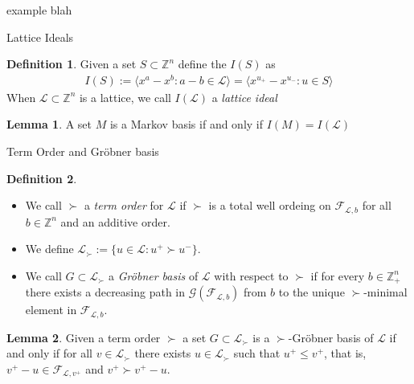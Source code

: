 \documentclass[9pt]{beamer}
\newcommand\set[1]{\{#1\}}
\newcommand\Z{\mathbb{Z}}
\theoremstyle{definition}
\newtheorem{lem}{Lemma}
\newtheorem{defn}{Definition}
\begin{document}
\begin{frame}[fragile]{example}
  blah
\end{frame}


\begin{frame}[fragile]{Lattice Ideals}
  \begin{defn}
    Given a set $S \subset \Z^n$ define the $I(S)$ as
    \begin{align*}
      I(S) := \langle x^a - x^b : a - b \in \mathcal{L} \rangle
      = \langle x^{u_+} - x^{u_-} : u \in S \rangle
    \end{align*}
    When $\mathcal{L} \subset \Z^n$ is a lattice, we call $I(\mathcal{L})$ a
    \emph{lattice ideal}
  \end{defn}
  \begin{lem}
    A set $M$ is a Markov basis if and only if $I(M) = I(\mathcal{L})$
  \end{lem}
\end{frame}

\begin{frame}[fragile]{Term Order and Gr\"obner basis}
  \begin{defn}
    \begin{itemize}
    \item We call $\succ$ a \emph{term order} for $\mathcal{L}$ if $\succ$ is a total
      well ordeing on $\mathcal{F}_{\mathcal{L}, b}$ for all $b \in \Z^n$ and an
      additive order.
    \item We define $\mathcal{L}_{\succ} := \set{u \in \mathcal{L} : u^+ \succ u^-}$.
    \item We call $G \subset \mathcal{L}_{\succ}$ a \emph{Gr\"obner basis} of $\mathcal{L}$
      with respect to $\succ$ if for every $b \in\Z^n_+$ there exists a decreasing path
      in $\mathcal{G}(\mathcal{F}_{\mathcal{L}, b})$ from $b$ to the unique $\succ$-minimal
      element in $\mathcal{F}_{\mathcal{L}, b}$.
    \end{itemize}
  \end{defn}
  \begin{lem}
    Given a term order $\succ$ a set $G \subset \mathcal{L}_{\succ}$ is a
    $\succ$-Gr\"obner basis of $\mathcal{L}$ if and only if for all
    $v \in \mathcal{L}_{\succ}$ there exists $u \in \mathcal{L}_{\succ}$ such
    that $u^+ \leq v^+$, that is, $v^+ - u \in \mathcal{F}_{\mathcal{L}, v^+}$ and
    $v^+ \succ v^+ - u$.
  \end{lem}
\end{frame}
\end{document}
